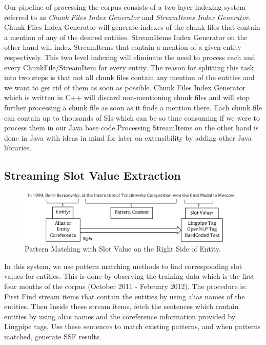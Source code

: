 Our pipeline of processing the corpus consists of a two layer indexing system 
referred to as \textit{Chunk Files Index Generator} and \textit{StreamItems Index Generator}.
Chunk Files Index Generator will generate indexes of the chunk files 
that contain a mention of any of the desired entities. StreamItems Index Generator 
on the other hand will index StreamItems that contain a mention of a given entity 
respectively. This two level indexing will eliminate the need to process each and 
every ChunkFile/StreamItem for every entity. The reason for splitting this task 
into two steps is that not all chunk files contain any mention of the entities and 
we want to get rid of them as soon as possible. Chunk Files Index Generator which 
is written in C++ will discard non-mentioning chunk files and will stop further 
processing a chunk file as soon as it finds a mention there. Each chunk file can 
contain up to thousands of SIs which can be so time consuming if we were to 
process them in our Java base code.Processing StreamItems on the other hand is 
done in Java with ideas in mind for later on extensibility by adding other Java libraries.



\subsection{Streaming Slot Value Extraction}
\label{sec:ssve}
\begin{figure}
\centering
\includegraphics[width=6in]{./images/Pattern-eps-converted-to.pdf}
\vspace*{-.1in} \caption{Pattern Matching with Slot Value on the Right Side of Entity. }\label{fig:pattern}
\vspace*{-.2in}
\end{figure}

In this system, we use pattern matching methods to find corresponding slot 
values for entities. This is done by observing the training data which is the first four months of the corpus (October 2011 - February 2012). The procedure is: First Find stream items that contain the 
entities by using alias names of the entities. Then Inside these stream items, 
fetch the sentences which contain entities by using alias names and the 
coreference information provided by Lingpipe tags. Use these sentences to 
match existing patterns, and when patterns matched, generate SSF results.

